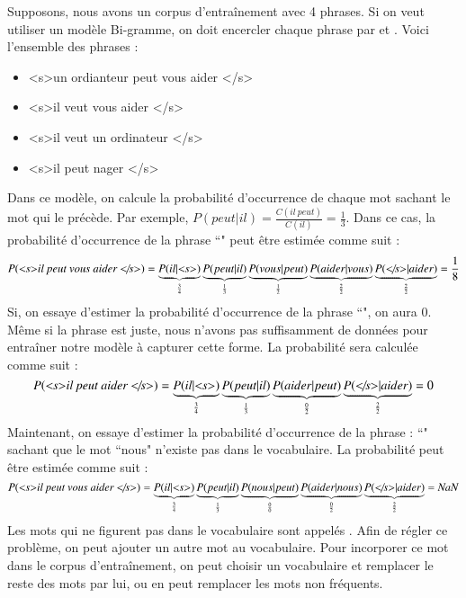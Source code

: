 \documentclass{KodeBook}
\begin{document}
Supposons, nous avons un corpus d'entraînement avec 4 phrases. 
Si on veut utiliser un modèle Bi-gramme, on doit encercler chaque phrase par  et .
Voici l'ensemble des phrases :
\begin{itemize}
	\item \textless s\textgreater un ordianteur peut vous aider \textless/s\textgreater
	\item \textless s\textgreater il veut vous aider \textless/s\textgreater
	\item \textless s\textgreater il veut un ordinateur \textless/s\textgreater
	\item \textless s\textgreater il peut nager \textless/s\textgreater
\end{itemize}
%
Dans ce modèle, on calcule la probabilité d'occurrence de chaque mot sachant le mot qui le précède. 
Par exemple, $P(peut | il) = \frac{C(il\ peut)}{C(il)} = \frac{1}{3}$.
Dans ce cas, la probabilité d'occurrence de la phrase ``" peut être estimée comme suit :
\[
P(\text{\textit{\textless s\textgreater il peut vous aider \textless/s\textgreater}}) = 
\underbrace{P(il|\text{\textit{\textless s\textgreater}})}_{\frac{3}{4}}
\underbrace{P(peut|il)}_{\frac{1}{3}} 
\underbrace{P(vous|peut)}_{\frac{1}{2}} 
\underbrace{P(aider|vous)}_{\frac{2}{2}}
\underbrace{P(\text{\textit{\textless/s\textgreater}}|aider)}_{\frac{2}{2}} = 
\frac{1}{8}
\]
%
Si, on essaye d'estimer la probabilité d'occurrence de la phrase ``", on aura $0$. 
Même si la phrase est juste, nous n'avons pas suffisamment de données pour entraîner notre modèle à capturer cette forme. 
La probabilité sera calculée comme suit : 
\[
P(\text{\textit{\textless s\textgreater il peut aider \textless/s\textgreater}}) = 
\underbrace{P(il|\text{\textit{\textless s\textgreater}})}_{\frac{3}{4}}
\underbrace{P(peut|il)}_{\frac{1}{3}} 
\underbrace{P(aider|peut)}_{\frac{0}{2}}
\underbrace{P(\text{\textit{\textless/s\textgreater}}|aider)}_{\frac{2}{2}} = 
0
\]
%
Maintenant, on essaye d'estimer la probabilité d'occurrence de la phrase : 
``" sachant que le mot ``nous" n'existe pas dans le vocabulaire. 
La probabilité peut être estimée comme suit : 
\[
P(\text{\textit{\textless s\textgreater il peut vous aider \textless/s\textgreater}}) = 
\underbrace{P(il|\text{\textit{\textless s\textgreater}})}_{\frac{3}{4}}
\underbrace{P(peut|il)}_{\frac{1}{3}} 
\underbrace{P(nous|peut)}_{\frac{0}{0}} 
\underbrace{P(aider|nous)}_{\frac{0}{2}}
\underbrace{P(\text{\textit{\textless/s\textgreater}}|aider)}_{\frac{2}{2}} = 
\text{\textit{NaN}}
\]
Les mots qui ne figurent pas dans le vocabulaire sont appelés . 
Afin de régler ce problème, on peut ajouter un autre mot  au vocabulaire. 
Pour incorporer ce mot dans le corpus d'entraînement, on peut choisir un vocabulaire et remplacer le reste des mots par lui, ou en peut remplacer les mots non fréquents. 
\end{document}
